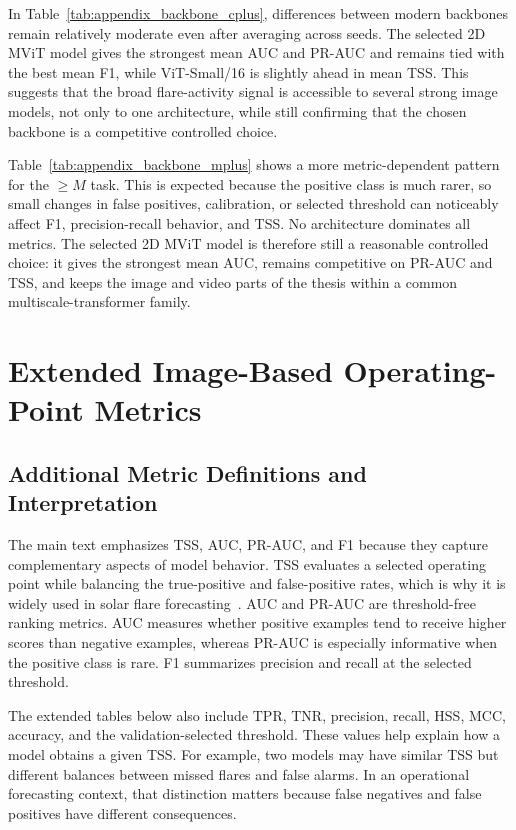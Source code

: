 \FloatBarrier

In Table~\ref{tab:appendix_backbone_cplus}, differences between modern backbones remain relatively moderate even after averaging across seeds. The selected 2D MViT model gives the strongest mean AUC and PR-AUC and remains tied with the best mean F1, while ViT-Small/16 is slightly ahead in mean TSS. This suggests that the broad flare-activity signal is accessible to several strong image models, not only to one architecture, while still confirming that the chosen backbone is a competitive controlled choice.

Table~\ref{tab:appendix_backbone_mplus} shows a more metric-dependent pattern for the $\geq M$ task. This is expected because the positive class is much rarer, so small changes in false positives, calibration, or selected threshold can noticeably affect F1, precision-recall behavior, and TSS. No architecture dominates all metrics. The selected 2D MViT model is therefore still a reasonable controlled choice: it gives the strongest mean AUC, remains competitive on PR-AUC and TSS, and keeps the image and video parts of the thesis within a common multiscale-transformer family.

\FloatBarrier

\chapter{Extended Image-Based Operating-Point Metrics}
\label{app:extended_image_operating_metrics}

\section{Additional Metric Definitions and Interpretation}
\label{app:metric_definitions}

The main text emphasizes TSS, AUC, PR-AUC, and F1 because they capture complementary aspects of model behavior. TSS evaluates a selected operating point while balancing the true-positive and false-positive rates, which is why it is widely used in solar flare forecasting~\cite{ref_bloomfield}. AUC and PR-AUC are threshold-free ranking metrics. AUC measures whether positive examples tend to receive higher scores than negative examples, whereas PR-AUC is especially informative when the positive class is rare. F1 summarizes precision and recall at the selected threshold.

The extended tables below also include TPR, TNR, precision, recall, HSS, MCC, accuracy, and the validation-selected threshold. These values help explain how a model obtains a given TSS. For example, two models may have similar TSS but different balances between missed flares and false alarms. In an operational forecasting context, that distinction matters because false negatives and false positives have different consequences.

